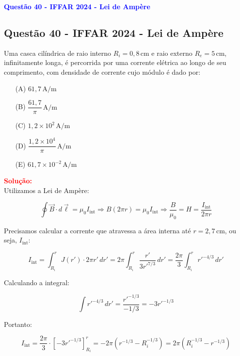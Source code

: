 \begin{flushleft}
\textbf{\textcolor{blue}{\Large Quest\~ao 40 - IFFAR 2024 - Lei de Amp\`ere}}\\
\noindent

\subsection{Quest\~ao 40 - IFFAR 2024 - Lei de Amp\`ere}
Uma casca cilíndrica de raio interno \( R_i = 0{,}8\,\text{cm} \) e raio externo \( R_e = 5\,\text{cm} \), infinitamente longa, 
é percorrida por uma corrente elétrica ao longo de seu comprimento, com densidade de corrente cujo módulo é dado por:

\begin{itemize}
\item[(A)] $61{,}7 \, \text{A/m}$
\item[(B)] $\dfrac{61{,}7}{\pi} \, \text{A/m}$
\item[(C)] $1{,}2 \times 10^2 \, \text{A/m}$
\item[(D)] $\dfrac{1{,}2 \times 10^4}{\pi} \, \text{A/m}$
\item[(E)] $61{,}7 \times 10^{-2} \, \text{A/m}$
\end{itemize}

\vspace{0.5cm}

\textcolor{red}{\textbf{Solução:}}\\

Utilizamos a Lei de Ampère:

\[
\oint \vec{B} \cdot d\vec{\ell} = \mu_0 I_{\text{int}} \Rightarrow B(2\pi r) = \mu_0 I_{\text{int}} \Rightarrow \frac{B}{\mu_0} = H = \frac{I_{\text{int}}}{2\pi r}
\]

Precisamos calcular a corrente que atravessa a área interna até \( r = 2{,}7\,\text{cm} \), ou seja, \( I_{\text{int}} \):

\[
I_{\text{int}} = \int_{R_i}^{r} J(r') \cdot 2\pi r' \, dr' = 2\pi \int_{R_i}^{r} \frac{r'}{3 r'^{7/3}} \, dr' = \frac{2\pi}{3} \int_{R_i}^{r} r'^{-4/3} \, dr'
\]

Calculando a integral:

\[
\int r'^{-4/3} \, dr' = \frac{r'^{-1/3}}{-1/3} = -3 r'^{-1/3}
\]

Portanto:

\[
I_{\text{int}} = \frac{2\pi}{3} \cdot \left[-3 r'^{-1/3} \right]_{R_i}^{r}
= -2\pi \left( r^{-1/3} - R_i^{-1/3} \right)
= 2\pi \left( R_i^{-1/3} - r^{-1/3} \right)
\]


\end{flushleft}

